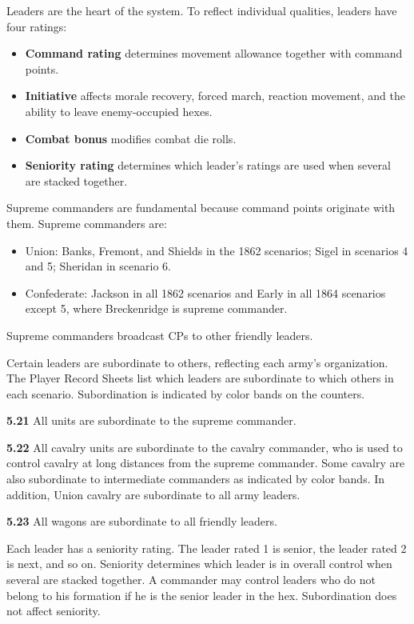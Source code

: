 
Leaders are the heart of the system. To reflect individual qualities, leaders have four ratings:

\begin{itemize}
\item \textbf{Command rating} determines movement allowance together with command points.
\item \textbf{Initiative} affects morale recovery, forced march, reaction movement, and the ability to leave enemy-occupied hexes.
\item \textbf{Combat bonus} modifies combat die rolls.
\item \textbf{Seniority rating} determines which leader's ratings are used when several are stacked together.
\end{itemize}


Supreme commanders are fundamental because command points originate with them. Supreme commanders are:

\begin{itemize}
\item Union: Banks, Fremont, and Shields in the 1862 scenarios; Sigel in scenarios 4 and 5; Sheridan in scenario 6.
\item Confederate: Jackson in all 1862 scenarios and Early in all 1864 scenarios except 5, where Breckenridge is supreme commander.
\end{itemize}

Supreme commanders broadcast CPs to other friendly leaders.


Certain leaders are subordinate to others, reflecting each army's organization. The Player Record Sheets list which leaders are subordinate to which others in each scenario. Subordination is indicated by color bands on the counters.

\textbf{5.21} All units are subordinate to the supreme commander.

\textbf{5.22} All cavalry units are subordinate to the cavalry commander, who is used to control cavalry at long distances from the supreme commander. Some cavalry are also subordinate to intermediate commanders as indicated by color bands. In addition, Union cavalry are subordinate to all army leaders.

\textbf{5.23} All wagons are subordinate to all friendly leaders.


Each leader has a seniority rating. The leader rated 1 is senior, the leader rated 2 is next, and so on. Seniority determines which leader is in overall control when several are stacked together. A commander may control leaders who do not belong to his formation if he is the senior leader in the hex. Subordination does not affect seniority.
